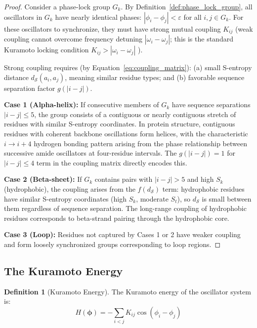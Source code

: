 \documentclass[11pt,twocolumn,a4paper]{article}
\theoremstyle{definition}
\newtheorem{definition}[theorem]{Definition}
\theoremstyle{remark}
\newcommand{\Sk}{S_k}
\newcommand{\St}{S_t}
\newcommand{\Sspace}{\mathcal{S}}
\newcommand{\phaselk}{\varepsilon}
\newcommand{\natfreq}{\omega}
\begin{document}
\begin{proof}
Consider a phase-lock group $G_k$. By Definition~\ref{def:phase_lock_group}, all oscillators in $G_k$ have nearly identical phases: $|\phi_i - \phi_j| < \phaselk$ for all $i, j \in G_k$. For these oscillators to synchronize, they must have strong mutual coupling $K_{ij}$ (weak coupling cannot overcome frequency detuning $|\natfreq_i - \natfreq_j|$; this is the standard Kuramoto locking condition $K_{ij} > |\natfreq_i - \natfreq_j|$ \citep{kuramoto1984}).

Strong coupling requires (by Equation~\ref{eq:coupling_matrix}): (a) small S-entropy distance $d_{\Sspace}(a_i, a_j)$, meaning similar residue types; and (b) favorable sequence separation factor $g(|i-j|)$.

\textbf{Case 1 (Alpha-helix):} If consecutive members of $G_k$ have sequence separations $|i-j| \leq 5$, the group consists of a contiguous or nearly contiguous stretch of residues with similar S-entropy coordinates. In protein structure, contiguous residues with coherent backbone oscillations form helices, with the characteristic $i \to i+4$ hydrogen bonding pattern arising from the phase relationship between successive amide oscillators at four-residue intervals. The $g(|i-j|) = 1$ for $|i-j| \leq 4$ term in the coupling matrix directly encodes this.

\textbf{Case 2 (Beta-sheet):} If $G_k$ contains pairs with $|i - j| > 5$ and high $\Sk$ (hydrophobic), the coupling arises from the $f(d_{\Sspace})$ term: hydrophobic residues have similar S-entropy coordinates (high $\Sk$, moderate $\St$), so $d_{\Sspace}$ is small between them regardless of sequence separation. The long-range coupling of hydrophobic residues corresponds to beta-strand pairing through the hydrophobic core.

\textbf{Case 3 (Loop):} Residues not captured by Cases 1 or 2 have weaker coupling and form loosely synchronized groups corresponding to loop regions.
\end{proof}

\subsection{The Kuramoto Energy}

\begin{definition}[Kuramoto Energy]
\label{def:kuramoto_energy}
The Kuramoto energy of the oscillator system is:
\begin{equation}
\label{eq:kuramoto_energy}
H(\boldsymbol{\phi}) = -\sum_{i<j} K_{ij} \cos(\phi_i - \phi_j)
\end{equation}
\end{definition}
\end{document}
